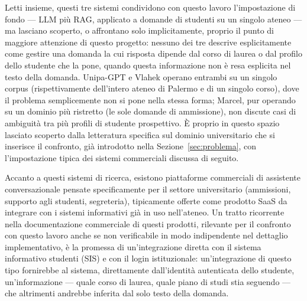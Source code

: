 Letti insieme, questi tre sistemi condividono con questo lavoro l'impostazione di fondo --- LLM più RAG, applicato a
domande di studenti su un singolo ateneo --- ma lasciano scoperto, o affrontano solo implicitamente, proprio il punto
di maggiore attenzione di questo progetto: nessuno dei tre descrive esplicitamente come gestire una domanda la cui
risposta dipende dal corso di laurea o dal profilo dello studente che la pone, quando questa informazione non è resa
esplicita nel testo della domanda. Unipa-GPT e Vlahek operano entrambi su un singolo corpus (rispettivamente
dell'intero ateneo di Palermo e di un singolo corso), dove il problema semplicemente non si pone nella stessa forma;
Marcel, pur operando su un dominio più ristretto (le sole domande di ammissione), non discute casi di ambiguità tra
più profili di studente prospettivo. È proprio in questo spazio lasciato scoperto dalla letteratura specifica sul
dominio universitario che si inserisce il confronto, già introdotto nella Sezione~\ref{sec:problema}, con
l'impostazione tipica dei sistemi commerciali discussa di seguito.

Accanto a questi sistemi di ricerca, esistono piattaforme commerciali di assistente conversazionale pensate
specificamente per il settore universitario (ammissioni, supporto agli studenti, segreteria), tipicamente offerte
come prodotto SaaS da integrare con i sistemi informativi già in uso nell'ateneo. Un tratto ricorrente nella
documentazione commerciale di questi prodotti, rilevante per il confronto con questo lavoro anche se non verificabile
in modo indipendente nel dettaglio implementativo, è la promessa di un'integrazione diretta con il sistema
informativo studenti (SIS) e con il login istituzionale: un'integrazione di questo tipo fornirebbe al sistema,
direttamente dall'identità autenticata dello studente, un'informazione --- quale corso di laurea, quale piano di
studi stia seguendo --- che altrimenti andrebbe inferita dal solo testo della domanda.

